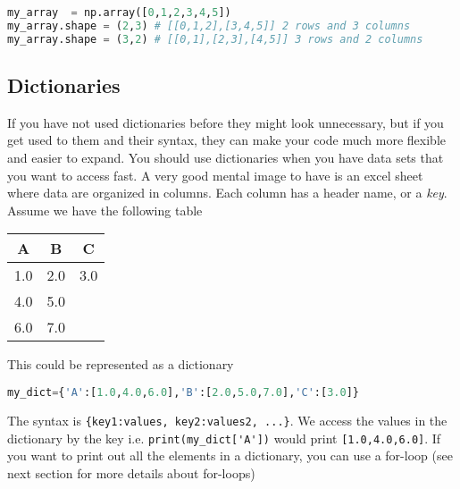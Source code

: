 \documentclass[graybox,sectrefs,envcountresetchap,open=right,final]{svmonodo}
\begin{document}
\begin{lstlisting}[language=python,style=blue1bar]
my_array  = np.array([0,1,2,3,4,5])
my_array.shape = (2,3) # [[0,1,2],[3,4,5]] 2 rows and 3 columns
my_array.shape = (3,2) # [[0,1],[2,3],[4,5]] 3 rows and 2 columns

\end{lstlisting}


\subsection{Dictionaries}
If you have not used dictionaries before they might look unnecessary, but if you get used to them and their syntax, they can make your code much more flexible and easier to expand. You should use dictionaries when you have data sets that you want to access fast. A very good mental image to have is an excel sheet where data are organized in columns. Each column has a header name, or a \emph{key}. Assume we have the following table



{\small   %

\vspace{4mm}

\begin{tabular}{ccc}
\hline
\multicolumn{1}{c}{ A } & \multicolumn{1}{c}{ B } & \multicolumn{1}{c}{ C } \\
\hline
1.0 & 2.0 & 3.0 \\
4.0 & 5.0 &     \\
6.0 & 7.0 &     \\
\hline
\end{tabular}

\vspace{4mm}

}


\noindent
This could be represented as a dictionary


\begin{lstlisting}[language=python,style=blue1bar]
my_dict={'A':[1.0,4.0,6.0],'B':[2.0,5.0,7.0],'C':[3.0]}

\end{lstlisting}

The syntax is \Verb!{key1:values, key2:values2, ...}!. We access the values in the dictionary by the key i.e. \Verb!print(my_dict['A'])! would print \texttt{[1.0,4.0,6.0]}. If you want to print out all the elements in a dictionary, you can use a for-loop (see next section for more details about for-loops)
\end{document}
